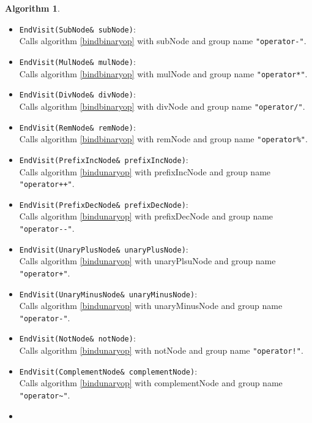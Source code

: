 \documentclass[a4paper,oneside,11pt]{book}
\theoremstyle{definition}
\newtheorem{algo}{Algorithm}[section]
\begin{document}
\begin{algo}
\begin{itemize}
\item
\verb|EndVisit(SubNode& subNode)|:\\
Calls algorithm \ref{bindbinaryop} with subNode and group name \verb|"operator-"|.\\
\item
\verb|EndVisit(MulNode& mulNode)|:\\
Calls algorithm \ref{bindbinaryop} with mulNode and group name \verb|"operator*"|.\\
\item
\verb|EndVisit(DivNode& divNode)|:\\
Calls algorithm \ref{bindbinaryop} with divNode and group name \verb|"operator/"|.\\
\item
\verb|EndVisit(RemNode& remNode)|:\\
Calls algorithm \ref{bindbinaryop} with remNode and group name \verb|"operator%"|.\\
\item
\verb|EndVisit(PrefixIncNode& prefixIncNode)|:\\
Calls algorithm \ref{bindunaryop} with prefixIncNode and group name \verb|"operator++"|.\\
\item
\verb|EndVisit(PrefixDecNode& prefixDecNode)|:\\
Calls algorithm \ref{bindunaryop} with prefixDecNode and group name \verb|"operator--"|.\\
\item
\verb|EndVisit(UnaryPlusNode& unaryPlusNode)|:\\
Calls algorithm \ref{bindunaryop} with unaryPlsuNode and group name \verb|"operator+"|.\\
\item
\verb|EndVisit(UnaryMinusNode& unaryMinusNode)|:\\
Calls algorithm \ref{bindunaryop} with unaryMinusNode and group name \verb|"operator-"|.\\
\item
\verb|EndVisit(NotNode& notNode)|:\\
Calls algorithm \ref{bindunaryop} with notNode and group name \verb|"operator!"|.\\
\item
\verb|EndVisit(ComplementNode& complementNode)|:\\
Calls algorithm \ref{bindunaryop} with complementNode and group name \verb|"operator~"|.\\
\item

\end{itemize}
\end{algo}
\end{document}
